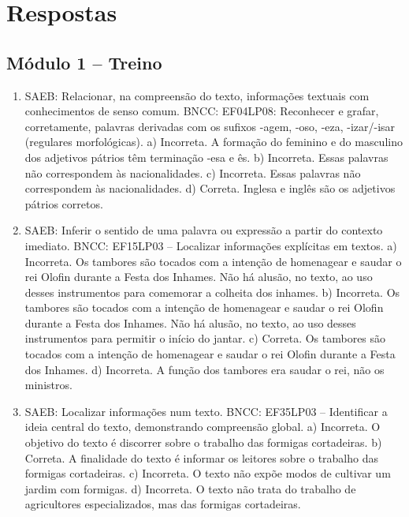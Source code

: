\chapter{Respostas}
\pagestyle{plain}
\footnotesize

\pagecolor{gray!40}

\section*{Módulo 1 – Treino}

\begin{enumerate}
\item
SAEB: Relacionar, na compreensão do texto, informações textuais
com conhecimentos de senso comum.
BNCC: EF04LP08: Reconhecer e grafar, corretamente, palavras derivadas
com os sufixos -agem, -oso, -eza, -izar/-isar (regulares morfológicas).
a) Incorreta. A formação do feminino e do masculino dos adjetivos
pátrios têm terminação -esa e ês.
b) Incorreta. Essas palavras não correspondem às nacionalidades.
c) Incorreta. Essas palavras não correspondem às nacionalidades.
d) Correta. Inglesa e inglês são os adjetivos pátrios corretos.

\item
SAEB: Inferir o sentido de uma palavra ou expressão a partir do
contexto imediato.
BNCC: EF15LP03 -- Localizar informações explícitas em textos.
a) Incorreta. Os tambores são tocados com a intenção de homenagear e
saudar o rei Olofin durante a Festa dos Inhames. Não há alusão, no texto, ao uso desses instrumentos para comemorar a colheita dos inhames.
b) Incorreta. Os tambores são tocados com a intenção de homenagear e
saudar o rei Olofin durante a Festa dos Inhames. Não há alusão, no texto, ao uso desses instrumentos para permitir o início do jantar.
c) Correta. Os tambores são tocados com a intenção de homenagear e
saudar o rei Olofin durante a Festa dos Inhames.
d) Incorreta. A função dos tambores era saudar o rei, não os ministros.

\item
SAEB: Localizar informações num texto.
BNCC: EF35LP03 -- Identificar a ideia central do texto, demonstrando
compreensão global.
a) Incorreta. O objetivo do texto é discorrer sobre o trabalho das
formigas cortadeiras.
b) Correta. A finalidade do texto é informar os leitores sobre o
trabalho das formigas cortadeiras.
c) Incorreta. O texto não expõe modos de cultivar um jardim com formigas.
d) Incorreta. O texto não trata do trabalho de agricultores 
especializados, mas das formigas cortadeiras.
\end{enumerate}

